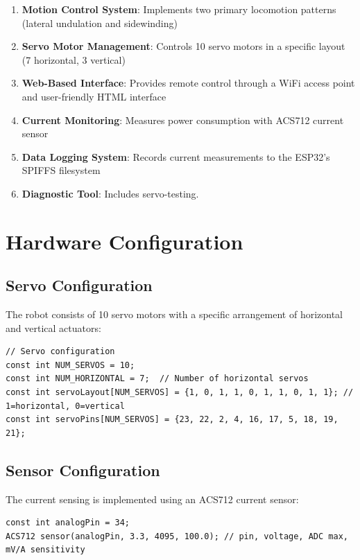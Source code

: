 \documentclass[12pt,a4paper]{report}
\begin{document}
\begin{enumerate}
    \item \textbf{Motion Control System}: Implements two primary locomotion patterns (lateral undulation and sidewinding)
    \item \textbf{Servo Motor Management}: Controls 10 servo motors in a specific layout (7 horizontal, 3 vertical)
    \item \textbf{Web-Based Interface}: Provides remote control through a WiFi access point and user-friendly HTML interface
    \item \textbf{Current Monitoring}: Measures power consumption with ACS712 current sensor
    \item \textbf{Data Logging System}: Records current measurements to the ESP32's SPIFFS filesystem
    \item \textbf{Diagnostic Tool}: Includes servo-testing.
\end{enumerate}

\section{Hardware Configuration}

\subsection{Servo Configuration}
The robot consists of 10 servo motors with a specific arrangement of horizontal and vertical actuators:

\begin{verbatim}
// Servo configuration
const int NUM_SERVOS = 10;
const int NUM_HORIZONTAL = 7;  // Number of horizontal servos
const int servoLayout[NUM_SERVOS] = {1, 0, 1, 1, 0, 1, 1, 0, 1, 1}; // 1=horizontal, 0=vertical
const int servoPins[NUM_SERVOS] = {23, 22, 2, 4, 16, 17, 5, 18, 19, 21};
\end{verbatim}

\subsection{Sensor Configuration}
The current sensing is implemented using an ACS712 current sensor:

\begin{verbatim}
const int analogPin = 34;
ACS712 sensor(analogPin, 3.3, 4095, 100.0); // pin, voltage, ADC max, mV/A sensitivity
\end{verbatim}
\end{document}
